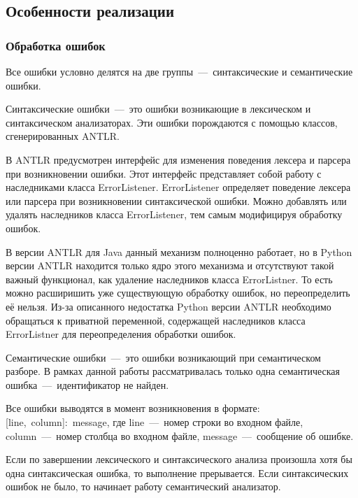 \documentclass[12pt,a4paper,oneside]{extarticle}
\begin{document}
    \clearpage

    \subsection{Особенности реализации}
        \subsubsection{Обработка ошибок}
            \label{subsubsec:error}
            Все ошибки условно делятся на две группы~---~синтаксические и семантические ошибки.

            Синтаксические ошибки~---~это ошибки возникающие в лексическом и синтаксическом анализаторах.
            Эти ошибки порождаются с помощью классов, сгенерированных ANTLR.

            В ANTLR предусмотрен интерфейс для изменения поведения лексера и парсера при возникновении ошибки.
            Этот интерфейс представляет собой работу с наследниками класса ErrorListener.
            ErrorListener определяет поведение лексера или парсера при возникновении синтаксической ошибки.
            Можно добавлять или удалять наследников класса ErrorListener, тем самым модифицируя обработку ошибок.

            В версии ANTLR для Java данный механизм полноценно работает, но в Python версии ANTLR находится только ядро этого механизма и отсутствуют такой важный функционал, как удаление наследников класса ErrorListner.
            То есть можно расширишить уже существующую обработку ошибок, но переопределить её нельзя.
            Из-за описанного недостатка Python версии ANTLR необходимо обращаться к приватной переменной, содержащей наследников класса ErrorListner для переопределения обработки ошибок.

            Семантические ошибки~---~это ошибки возникающий при семантическом разборе. В рамках данной работы рассматривалась только одна семантическая ошибка~---~идентификатор не найден.

            Все ошибки выводятся в момент возникновения в формате: [line,~column]:~message, где line~---~номер строки во входном файле, column~---~номер столбца во входном файле, message~---~сообщение об ошибке.

            Если по завершении лексического и синтаксического анализа произошла хотя бы одна синтаксическая ошибка, то выполнение прерывается. Если синтаксических ошибок не было, то начинает работу семантический анализатор. 
\end{document}

